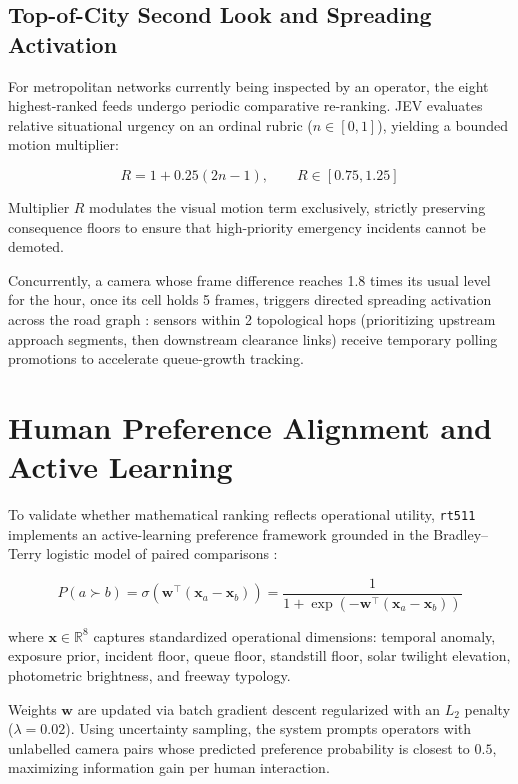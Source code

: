 \documentclass[10pt,journal,compsoc]{IEEEtran}
\begin{document}
\subsection{Top-of-City Second Look and Spreading Activation}
\label{sec:secondlook}
For metropolitan networks currently being inspected by an operator, the eight highest-ranked feeds undergo periodic comparative re-ranking. JEV evaluates relative situational urgency on an ordinal rubric ($n \in [0, 1]$), yielding a bounded motion multiplier:

\begin{equation}
R = 1 + 0.25(2n - 1), \qquad R \in [0.75, 1.25]
\end{equation}

\noindent Multiplier $R$ modulates the visual motion term exclusively, strictly preserving consequence floors to ensure that high-priority emergency incidents cannot be demoted.

Concurrently, a camera whose frame difference reaches 1.8 times its usual level for the hour, once its cell holds 5 frames, triggers directed spreading activation across the road graph \cite{collins1975}: sensors within 2 topological hops (prioritizing upstream approach segments, then downstream clearance links) receive temporary polling promotions to accelerate queue-growth tracking.

\section{Human Preference Alignment and Active Learning}
To validate whether mathematical ranking reflects operational utility, \texttt{rt511} implements an active-learning preference framework grounded in the Bradley--Terry logistic model of paired comparisons \cite{bradley1952, thurstone1927}:

\begin{equation}
P(a \succ b) = \sigma\left(\mathbf{w}^\top (\mathbf{x}_a - \mathbf{x}_b)\right) = \frac{1}{1 + \exp\left(-\mathbf{w}^\top (\mathbf{x}_a - \mathbf{x}_b)\right)}
\end{equation}

\noindent where $\mathbf{x} \in \mathbb{R}^8$ captures standardized operational dimensions: temporal anomaly, exposure prior, incident floor, queue floor, standstill floor, solar twilight elevation, photometric brightness, and freeway typology. 

Weights $\mathbf{w}$ are updated via batch gradient descent regularized with an $L_2$ penalty ($\lambda = 0.02$). Using uncertainty sampling, the system prompts operators with unlabelled camera pairs whose predicted preference probability is closest to $0.5$, maximizing information gain per human interaction.
\end{document}
